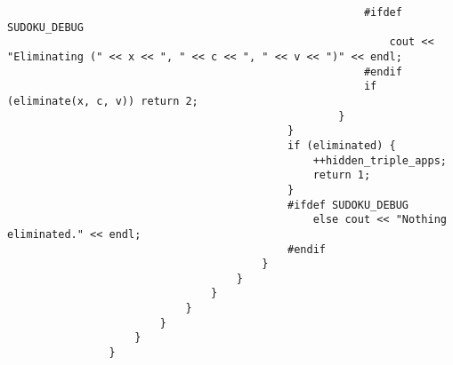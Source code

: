 \documentclass{article}
\begin{document}
\begin{lstlisting}
                                                        #ifdef SUDOKU_DEBUG
                                                            cout << "Eliminating (" << x << ", " << c << ", " << v << ")" << endl;
                                                        #endif
                                                        if (eliminate(x, c, v)) return 2;
                                                    }
                                            }
                                            if (eliminated) {
                                                ++hidden_triple_apps;
                                                return 1;
                                            }
                                            #ifdef SUDOKU_DEBUG
                                                else cout << "Nothing eliminated." << endl;
                                            #endif
                                        }
                                    }
                                }
                            }
                        }
                    }
                }


\end{lstlisting}
\end{document}
